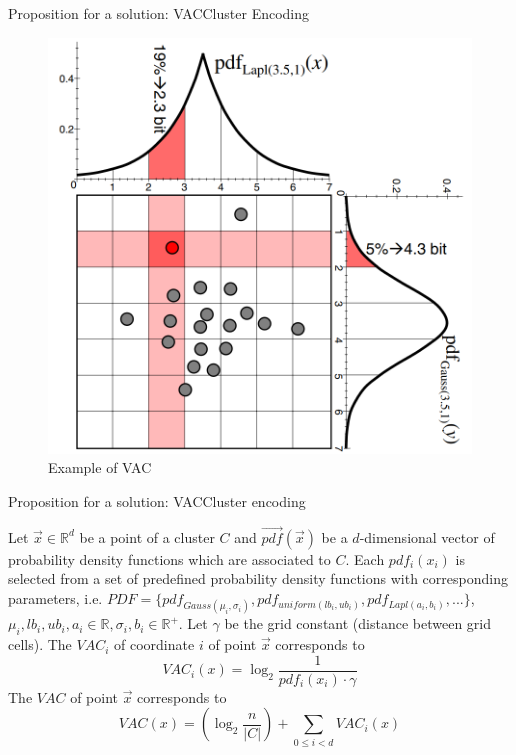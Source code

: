 \documentclass{beamer}
\begin{document}
  
  \begin{frame}{Proposition for a solution: VAC}{Cluster Encoding}
    \begin{figure}
      \centering
      \includegraphics[width=0.65\linewidth]{imgs/vac}
      \caption[]{Example of VAC\cite{Bohm2006-ts}}
      \label{fig:vac}
    \end{figure}    
  \end{frame}
  
  
  \begin{frame}{Proposition for a solution: VAC}{Cluster encoding}
    \begin{definition}
      Let $\vec{x} \in \mathbb{R}^d$ be a point of a cluster $C$ and $\overrightarrow{pdf}(\vec{x})$ be a $d$-dimensional vector of probability density functions  which are associated to $C$. Each $pdf_i(x_i)$ is selected from  a set of predefined probability density functions with corresponding parameters, i.e. $PDF = \{pdf_{Gauss(\mu_i, \sigma_i)}, pdf_{uniform(lb_i, ub_i)}, pdf_{Lapl(a_i, b_i)}, ...\}$, $\mu_i, lb_i, ub_i, a_i \in \mathbb{R}, \sigma_i, b_i \in \mathbb{R}^+$. Let $\gamma$ be the grid constant (distance between grid cells). The $VAC_i$ of coordinate $i$ of point $\vec{x}$ corresponds to
      \[VAC_i(x) = \log_2 \frac{1}{pdf_i(x_i) \cdot \gamma}\]
      The $VAC$ of point $\vec{x}$ corresponds to
      \[VAC(x) = \left( \log_2 \frac{n}{|C|}\right) + \sum_{0 \leq i < d} VAC_i(x)\]
    \end{definition}
  \end{frame}
  
\end{document}
